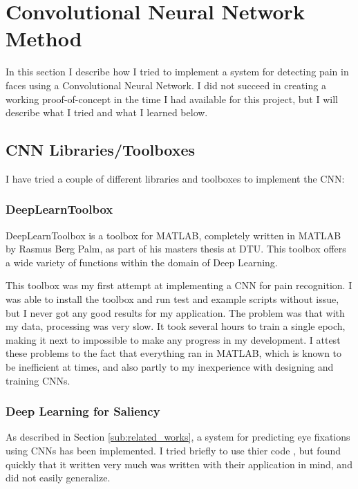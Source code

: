 \documentclass[Main]{subfiles}
\begin{document}
\section{Convolutional Neural Network Method} %
	\label{sec:convolutional_neural_network_method}
	In this section I describe how I tried to implement a system for detecting pain in faces using a Convolutional Neural Network.
	I did not succeed in creating a working proof-of-concept in the time I had available for this project, but I will describe what I tried and what I learned below.
	
	\subsection{CNN Libraries/Toolboxes} %
		\label{sub:cnn_libraries_toolboxes}
		I have tried a couple of different libraries and toolboxes to implement the CNN:
		
		\subsubsection{DeepLearnToolbox} %
			\label{ssub:deeplearntoolbox}
			DeepLearnToolbox \cite{IMM2012-06284} is a toolbox for MATLAB, completely written in MATLAB by Rasmus Berg Palm, as part of his masters thesis at DTU.
			This toolbox offers a wide variety of functions within the domain of Deep Learning.

			This toolbox was my first attempt at implementing a CNN for pain recognition.
			I was able to install the toolbox and run test and example scripts without issue, but I never got any good results for my application.
			The problem was that with my data, processing was very slow.
			It took several hours to train a single epoch, making it next to impossible to make any progress in my development.
			I attest these problems to the fact that everything ran in MATLAB, which is known to be inefficient at times, and also partly to my inexperience with designing and training CNNs.


		\subsubsection{Deep Learning for Saliency} %
			\label{ssub:deep_learning_for_saliency}
			As described in Section \ref{sub:related_works}, a system for predicting eye fixations using CNNs has been implemented.
			I tried briefly to use thier code \cite{Shen2012a}, but found quickly that it written very much was written with their application in mind, and did not easily generalize.
\end{document}
